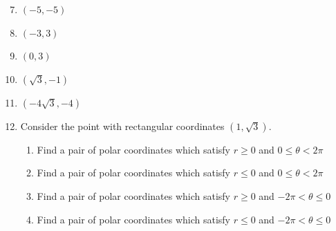 \documentclass[12pt]{article}
\newif\ifans
\begin{document}

\begin{enumerate}
\setcounter{enumi}{6}

\item $(-5, -5)$ 

\ifans{\fbox{I. $\left(5\sqrt{2},\frac{5\pi}{4}\right)$; II. $\left(5\sqrt{2},-\frac{3\pi}{4}\right)$}} \fi

\item $(-3, 3)$ 

\ifans{\fbox{I. $\left(3\sqrt{2},\frac{3\pi}{4}\right)$; II. $\left(3\sqrt{2},-\frac{5\pi}{4}\right)$}} \fi

\item $(0,3)$ 

\ifans{\fbox{I. $\left(3,\frac{\pi}{2}\right)$; II. $\left(3,-\frac{3\pi}{2}\right)$}} \fi

\item $\left(\sqrt{3}, -1\right)$ 

\ifans{\fbox{I. $\left(2,\frac{11\pi}{6}\right)$; II. $\left(2,-\frac{\pi}{6}\right)$}} \fi

\item $\left(-4\sqrt{3}, -4\right)$ 

\ifans{\fbox{I. $\left(8,\frac{7\pi}{6}\right)$; II. $\left(8,-\frac{5\pi}{6}\right)$}} \fi

\item Consider the point with rectangular coordinates $\left(1,\sqrt{3}\right)$.

\begin{enumerate}

\item Find a pair of polar coordinates which satisfy $r \geq 0$ and $0 \leq \theta< 2\pi$

\ifans{\fbox{$(r,\theta)=\left(2,\frac{\pi}{3}\right)$}} \fi

\item Find a pair of polar coordinates which satisfy $r \leq 0$ and $0 \leq \theta <2\pi$

\ifans{\fbox{$(r,\theta)=\left(-2,\frac{4\pi}{3}\right)$}} \fi

\item Find a pair of polar coordinates which satisfy $r \geq 0$ and $-2\pi < \theta \leq 0$

\ifans{\fbox{$(r,\theta)=\left(2,-\frac{5\pi}{3}\right)$}} \fi

\item Find a pair of polar coordinates which satisfy $r \leq 0$ and $-2\pi < \theta \leq 0$

\ifans{\fbox{$(r,\theta)=\left(-2,-\frac{2\pi}{3}\right)$}} \fi

\end{enumerate}

\end{enumerate}
\end{document}
